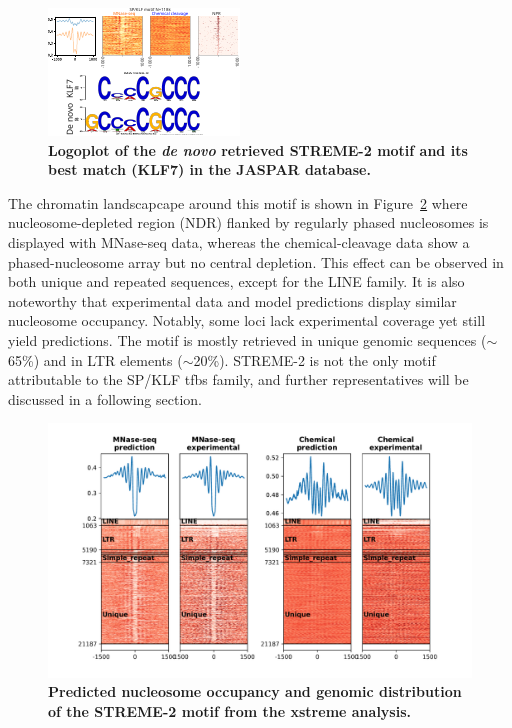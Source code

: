 \documentclass[11pt]{book}
\begin{document}
\begin{figure}[htbp]
    \centering
    \includegraphics[trim = 0cm 0cm 0cm 1cm, clip, width=\textwidth]{Figures/Results/KLF7_thesis.pdf}
    \caption{\textbf{Logoplot of the \textit{de novo} retrieved STREME-2 motif and its best match (KLF7) in the JASPAR database.}}
    \label{fig:klf_motif}
\end{figure}

The chromatin landscapcape around this motif is shown in Figure~\ref{fig:xstreme_2} where nucleosome-depleted region (NDR) flanked by regularly phased nucleosomes is displayed with MNase-seq data, whereas the chemical-cleavage data show a phased-nucleosome array but no central depletion. This effect can be observed in both unique and repeated sequences, except for the LINE family. It is also noteworthy that experimental data and model predictions display similar nucleosome occupancy. Notably, some loci lack experimental coverage yet still yield predictions. The motif is mostly retrieved in unique genomic sequences ($\sim$65\%) and in LTR elements ($\sim$20\%). STREME-2 is not the only motif attributable to the SP/KLF \gls{tfbs} family, and further representatives will be discussed in a following section.

\begin{figure}[htbp]
    \centering
    \includegraphics[trim=0cm 0cm 0cm 0cm, clip, width=\textwidth]{Figures/Results/xstreme_onrep_meta_hm/2-GCCMCGCCC_withexp.pdf}
    \caption{\textbf{Predicted nucleosome occupancy and genomic distribution of the STREME-2 motif from the xstreme analysis.}}
    \label{fig:xstreme_2}
\end{figure}
\end{document}
